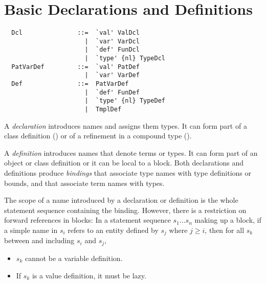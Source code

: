 \chapter{Basic Declarations and Definitions}
\label{sec:defs}

\syntax\begin{lstlisting}
  Dcl               ::=  `val' ValDcl
                      |  `var' VarDcl
                      |  `def' FunDcl
                      |  `type' {nl} TypeDcl
  PatVarDef         ::=  `val' PatDef
                      |  `var' VarDef
  Def               ::=  PatVarDef
                      |  `def' FunDef
                      |  `type' {nl} TypeDef
                      |  TmplDef
\end{lstlisting}

A {\em declaration} introduces names and assigns them types. It can
form part of a class definition () or of a
refinement in a compound type ().

A {\em definition} introduces names that denote terms or types. It can
form part of an object or class definition or it can be local to a
block.  Both declarations and definitions produce {\em bindings} that
associate type names with type definitions or bounds, and that
associate term names with types.

The scope of a name introduced by a declaration or definition is the
whole statement sequence containing the binding.  However, there is a
restriction on forward references in blocks: In a statement sequence
$s_1 \ldots s_n$ making up a block, if a simple name in $s_i$ refers
to an entity defined by $s_j$ where $j \geq i$, then for all $s_k$
between and including $s_i$ and $s_j$,
\begin{itemize}
\item $s_k$ cannot be a variable definition.
\item If $s_k$ is a value definition, it must be lazy.
\end{itemize}

